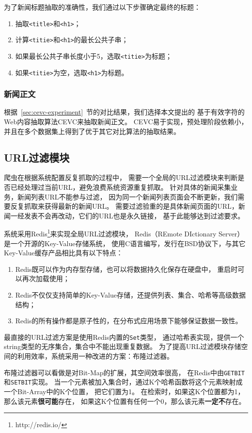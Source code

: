 为了新闻标题抽取的准确性，我们通过以下步骤确定最终的标题：
\begin{enumerate}
\item 抽取\texttt{<title>}和\texttt{<h1>}；
\item 计算\texttt{<titie>}和\texttt{<h1>}的最长公共子串；
\item 如果最长公共子串长度小于5，选取\texttt{<titie>}为标题；
\item 如果\texttt{<titie>}为空，选取\texttt{<h1>}为标题。
\end{enumerate}

\subsubsection{新闻正文}
根据~\ref{sec:cevc-experiment}~节的对比结果，我们选择本文提出的
基于有效字符的Web内容抽取算法CEVC来抽取新闻正文。
CEVC易于实现，预处理阶段依赖小，并且在多个数据集上得到了优于其它对比算法的抽取结果。

\subsection{URL过滤模块}
爬虫在根据系统配置反复抓取的过程中，
需要一个全局的URL过滤模块来判断是否已经处理过当前URL，避免浪费系统资源重复抓取。
针对具体的新闻采集业务，新闻列表URL不能参与过滤，
因为同一个新闻列表页面会不断更新，我们需要反复抓取来获得最新的新闻URL。
需要过滤验重的是具体新闻页面的URL，新闻一经发表不会再改动，它们的URL也是永久链接，
基于此能够达到过滤要求。

系统采用Redis\footnote{http://redis.io/}来实现全局URL过滤模块，
Redis（REmote DIctionary Server）是一个开源的Key-Value存储系统，
使用C语言编写，发行在BSD协议下，与其它Key-Value缓存产品相比具有以下特点：
\begin{enumerate}
\item Redis既可以作为内存型存储，也可以将数据持久化保存在硬盘中，
重启时可以再次加载使用；
\item Redis不仅仅支持简单的Key-Value存储，还提供列表、集合、哈希等高级数据结构；
\item Redis的所有操作都是原子性的，在分布式应用场景下能够保证数据一致性。
\end{enumerate}

最直接的URL过滤方案是使用Redis内置的\texttt{Set}类型，
通过哈希表实现，提供一个string类型的无序集合，集合中不能出现重复数据。
为了提高URL过滤模块存储空间的利用效率，系统采用一种改进的方案：布隆过滤器。

布隆过滤器可以看做是对Bit-Map的扩展，其空间效率很高，
在Redis中由\texttt{GETBIT}和\texttt{SETBIT}实现。
当一个元素被加入集合时，通过K个哈希函数将这个元素映射成一个Bit-Array中的K个位置，
把它们置为1。
在检索时，如果这K个位置都为1，那么该元素\textbf{很可能}存在，
如果这K个位置有任何一个0，那么该元素\textbf{一定不}存在。

